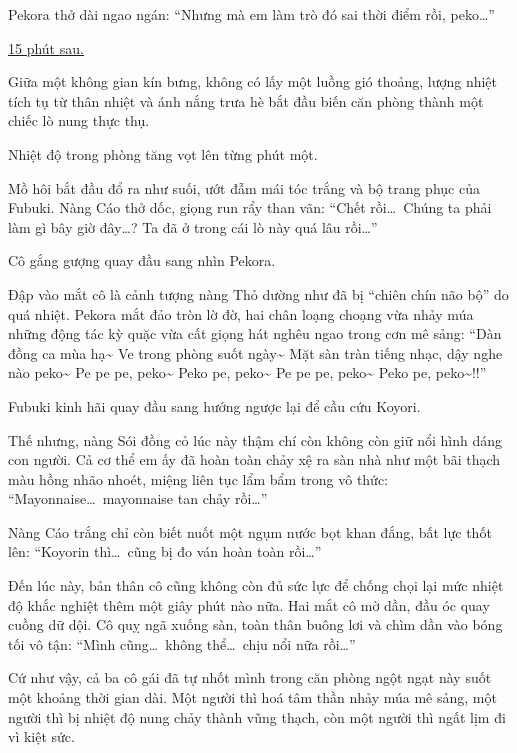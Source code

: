 \documentclass[../main.tex]{subfiles}
\begin{document}
Pekora thở dài ngao ngán: ``Nhưng mà em làm trò đó sai thời điểm rồi, peko\dots''

\begin{center}
  \uline{15 phút sau.}
\end{center}

Giữa một không gian kín bưng, không có lấy một luồng gió thoảng, lượng nhiệt tích tụ từ thân nhiệt và ánh nắng trưa hè bắt đầu biến căn phòng thành một chiếc lò nung thực thụ.

Nhiệt độ trong phòng tăng vọt lên từng phút một.

Mồ hôi bắt đầu đổ ra như suối, ướt đẫm mái tóc trắng và bộ trang phục của Fubuki. Nàng Cáo thở dốc, giọng run rẩy than vãn: ``Chết rồi\dots\ Chúng ta phải làm gì bây giờ đây\dots? Ta đã ở trong cái lò này quá lâu rồi\dots''

Cô gắng gượng quay đầu sang nhìn Pekora.

Đập vào mắt cô là cảnh tượng nàng Thỏ dường như đã bị ``chiên chín não bộ'' do quá nhiệt. Pekora mắt đảo tròn lờ đờ, hai chân loạng choạng vừa nhảy múa những động tác kỳ quặc vừa cất giọng hát nghêu ngao trong cơn mê sảng: ``Dàn đồng ca mùa hạ\~{} Ve trong phòng suốt ngày\~{} Mặt sàn tràn tiếng nhạc, dậy nghe nào peko\~{} Pe pe pe, peko\~{} Peko pe, peko\~{} Pe pe pe, peko\~{} Peko pe, peko\~{}!!''


Fubuki kinh hãi quay đầu sang hướng ngược lại để cầu cứu Koyori.

Thế nhưng, nàng Sói đồng cỏ lúc này thậm chí còn không còn giữ nổi hình dáng con người. Cả cơ thể em ấy đã hoàn toàn chảy xệ ra sàn nhà như một bãi thạch màu hồng nhão nhoét, miệng liên tục lẩm bẩm trong vô thức: ``Mayonnaise\dots\ mayonnaise tan chảy rồi\dots''


Nàng Cáo trắng chỉ còn biết nuốt một ngụm nước bọt khan đắng, bất lực thốt lên: ``Koyorin thì\dots\ cũng bị đo ván hoàn toàn rồi\dots''

Đến lúc này, bản thân cô cũng không còn đủ sức lực để chống chọi lại mức nhiệt độ khắc nghiệt thêm một giây phút nào nữa. Hai mắt cô mờ dần, đầu óc quay cuồng dữ dội. Cô quỵ ngã xuống sàn, toàn thân buông lơi và chìm dần vào bóng tối vô tận: ``Mình cũng\dots\ không thể\dots\ chịu nổi nữa rồi\dots''

Cứ như vậy, cả ba cô gái đã tự nhốt mình trong căn phòng ngột ngạt này suốt một khoảng thời gian dài. Một người thì hoá tâm thần nhảy múa mê sảng, một người thì bị nhiệt độ nung chảy thành vũng thạch, còn một người thì ngất lịm đi vì kiệt sức.
\end{document}
